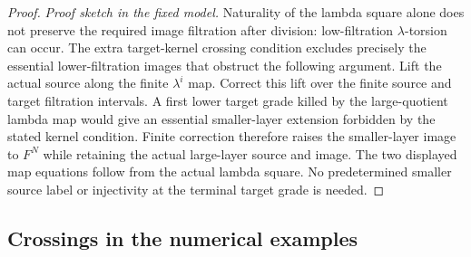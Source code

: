 \begin{proof}
\textit{Proof sketch in the fixed model.}
Naturality of the lambda square alone does not preserve the required
image filtration after division: low-filtration $\lambda$-torsion can
occur. The extra target-kernel crossing condition excludes precisely
the essential lower-filtration images that obstruct the following argument.
Lift the actual source along the finite $\lambda^i$ map. Correct this lift over the finite source and target filtration intervals. A first lower target grade killed by the large-quotient lambda map would give an essential smaller-layer extension forbidden by the stated kernel condition. Finite correction therefore raises the smaller-layer image to $F^N$ while retaining the actual large-layer source and image. The two displayed map equations follow from the actual lambda square. No predetermined smaller source label or injectivity at the terminal target grade is needed.
\end{proof}


\subsection{Crossings in the numerical examples}

